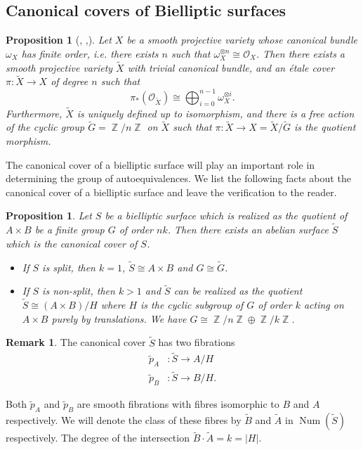 \documentclass[a4paper, 12pt, twoside]{amsart}
\theoremstyle{plain}
\newtheorem{proposition}[theorem]{Proposition}
\theoremstyle{definition}
\newtheorem{remark}[theorem]{Remark}
\DeclareMathOperator{\iso}{\cong}
\DeclareMathOperator{\num}{Num}
\DeclareMathOperator{\Z}{\mathbb{Z}}
\begin{document}
 \subsection{Canonical covers of Bielliptic surfaces}
\label{sec:can-cover-bielliptic}

\begin{proposition}[{\cite[\S 2]{1998math.....11101B}, \cite[\S 7.3]{MR2244106},\cite[\S 7.2]{MR2511017}}]
  Let $X$ be a smooth projective variety whose canonical bundle
  $\omega_X$ has finite order, i.e. there exists $n$ such that
  $\omega_X^{\otimes n} \iso \mathcal{O}_X$. Then there exists a
  smooth projective variety $\widetilde{X}$ with trivial canonical
  bundle, and an \'{e}tale cover $\pi \colon \widetilde{X} \to X$ of
  degree $n$ such that
\[
  \pi_*(\mathcal{O}_{\widetilde{X}}) \iso \bigoplus_{i=0}^{n-1} \omega_X^{\otimes i}.
\]
Furthermore, $\widetilde{X}$ is uniquely defined up to isomorphism,
and there is a free action of the cyclic group
$\widetilde{G} = \Z/n\Z$ on $\widetilde{X}$ such that
$\pi \colon \widetilde{X} \to X = \widetilde{X}/\widetilde{G}$ is the
quotient morphism.
\end{proposition}

The canonical cover of a bielliptic surface will play an important
role in determining the group of autoequivalences. We list the
following facts about the canonical cover of a bielliptic surface and
leave the verification to the reader.

\begin{proposition}
  Let $S$ be a bielliptic surface which is realized as the quotient of
  $A \times B$ be a finite group $G$ of order $nk$. Then there exists
  an abelian surface $\widetilde{S}$ which is the canonical cover of
  $S$. 
\begin{itemize}
\item If $S$ is split, then $k=1$, $\widetilde{S} \iso A \times B$ and
  $G \iso \widetilde{G}$.

\item If $S$ is non-split, then $k>1$ and $\widetilde{S}$ can be
  realized as the quotient $\widetilde{S} \iso (A \times B)/H$ where
  $H$ is the cyclic subgroup of $G$ of order $k$ acting on
  $A \times B$ purely by translations. We have
  $G \iso \Z/n\Z \oplus \Z/k\Z$.
\end{itemize}
\end{proposition}

\begin{remark}\label{rem:can-cover-bielliptic}
The canonical cover $\widetilde{S}$ has two fibrations
\begin{align*}
  \widetilde{p}_A &\colon \widetilde{S} \to A/H\\
  \widetilde{p}_B &\colon \widetilde{S} \to B/H.
\end{align*}

Both $\widetilde{p}_A$ and $\widetilde{p}_B$ are smooth fibrations
with fibres isomorphic to $B$ and $A$ respectively. We will denote the
class of these fibres by $\widetilde{B}$ and $\widetilde{A}$ in
$\num(\widetilde{S})$ respectively. The degree of the intersection
$\widetilde{B} \cdot \widetilde{A} = k = |H|$.
\end{remark}
\end{document}
